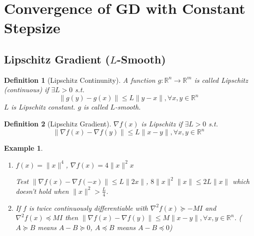 \documentclass[11pt,a4paper]{article}
\newtheorem{example}{Example}
\newtheorem{definition}{Definition}
\begin{document}
\section{Convergence of GD with Constant Stepsize}
\subsection{Lipschitz Gradient ($L$-Smooth)}
\begin{definition}[Lipschitz Continunity]
A function $g: \mathbb{R}^n \rightarrow	\mathbb{R}^m$ is called Lipschitz (continuous) if $\exists L>0$ s.t.
$$\|g(y)-g(x)\|\leq L\|y-x\|,\forall x,y\in \mathbb{R}^n$$
$L$ is Lipschitz constant. $g$ is called $L$-smooth.
\end{definition}

\begin{definition}[Lipschitz Gradient]
    $\nabla f(x)$ is Lipschitz if $\exists L>0$ s.t. $$\|\nabla f(x)-\nabla f(y)\|\leq L\|x-y\|,\forall x,y\in \mathbb{R}^n$$
\end{definition}

\begin{example}
    \quad

\begin{enumerate}
    \item $f(x)=\|x\|^4$, $\nabla f(x)=4\|x\|^2x$
    
    Test $\|\nabla f(x)-\nabla f(-x)\|\leq L\|2x\|$, $8\|x\|^2\|x\|\leq 2L\|x\|$ which doesn't hold when $\|x\|^2>\frac{L}{4}$.
    \item If $f$ is twice continuously differentiable with $\nabla^2 f(x)\succeq -MI$ and $\nabla^2 f(x)\preceq  MI$ then $\|\nabla f(x)-\nabla f(y)\|\leq M\|x-y\|,\forall x,y\in \mathbb{R}^n$. ($A\succeq B$ means $A-B\succeq 0$, $A\preceq B$ means $A-B\preceq 0$)
\end{enumerate}
\end{example}
\end{document}
